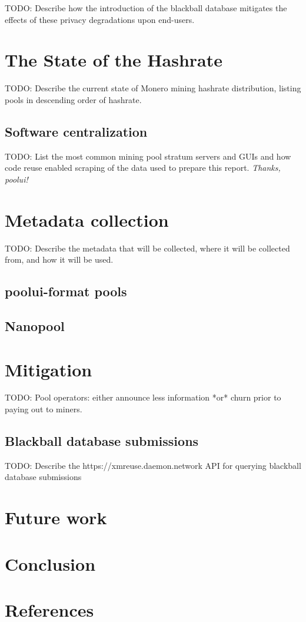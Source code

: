 \documentclass[notitlepage]{report}
\begin{document}
TODO: Describe how the introduction of the blackball database mitigates the effects of these privacy degradations upon end-users.

\section{The State of the Hashrate}

TODO: Describe the current state of Monero mining hashrate distribution, listing pools in descending order of hashrate.

\subsection{Software centralization}

TODO: List the most common mining pool stratum servers and GUIs and how code reuse enabled scraping of the data used to prepare this report.  \textit{Thanks, poolui!}

\section{Metadata collection}

TODO: Describe the metadata that will be collected, where it will be collected from, and how it will be used.

\subsection{poolui-format pools}

\subsection{Nanopool}

\section{Mitigation}

TODO: Pool operators: either announce less information *or* churn prior to paying out to miners.

\subsection{Blackball database submissions}

TODO: Describe the https://xmreuse.daemon.network API for querying blackball database submissions

\section{Future work}

\section{Conclusion}

\section{References}
\end{document}
